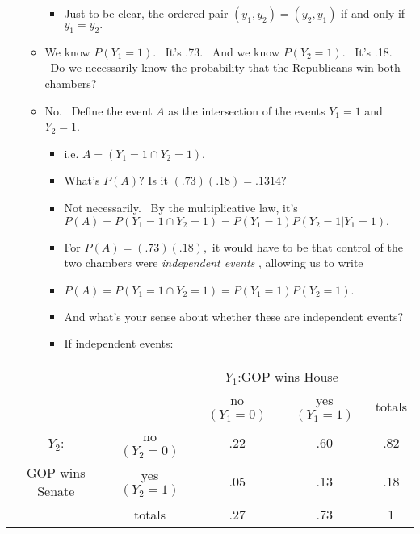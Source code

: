 \documentclass[11pt]{article}
\begin{document}
\begin{itemize}
\begin{itemize}
\begin{itemize}
\item Just to be clear, the ordered pair $(y_{1},y_{2})=(y_{2},y_{1})$ if
and only if $y_{1}=y_{2}.$
\end{itemize}

\item We know $P\left( Y_{1}=1\right) $. \ It's .73. \ And we know $P\left(
Y_{2}=1\right) .$ \ It's .18. \ Do we necessarily know the probability that
the Republicans win both chambers?

\item No. \ Define the event $A$ as the intersection of the events $Y_{1}=1$
and $Y_{2}=1.$ \ 

\begin{itemize}
\item i.e. $A=\left( Y_{1}=1\cap Y_{2}=1\right) .$

\item What's $P\left( A\right) ?$ Is it $\left( .73\right) \left( .18\right)
=.1314?$

\item Not necessarily. \ By the multiplicative law, it's $P\left( A\right)
=P\left( Y_{1}=1\cap Y_{2}=1\right) =P\left( Y_{1}=1\right) P\left(
Y_{2}=1|Y_{1}=1\right) .$

\item For $P\left( A\right) =\left( .73\right) \left( .18\right) ,$ it would
have to be that control of the two chambers were \textit{independent events}%
, allowing us to write

\item $P\left( A\right) =P\left( Y_{1}=1\cap Y_{2}=1\right) =P\left(
Y_{1}=1\right) P\left( Y_{2}=1\right) .$

\item And what's your sense about whether these are independent events?

\item If independent events:
\end{itemize}
\end{itemize}
\end{itemize}

\begin{center}
\begin{tabular}{ccccc}
&  & \multicolumn{2}{c}{$Y_{1}$:GOP wins House} &  \\ 
&  & no $\left( Y_{1}=0\right) $ & yes $\left( Y_{1}=1\right) $ & totals \\ 
$Y_{2}$: & no $\left( Y_{2}=0\right) $ & .22 & .60 & .82 \\ 
GOP wins Senate & yes $\left( Y_{2}=1\right) $ & .05 & .13 & .18 \\ 
& totals & .27 & .73 & 1%
\end{tabular}
\end{center}
\end{document}
